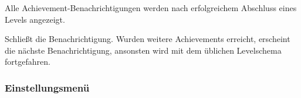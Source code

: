 \begin{center}
\setlength\fboxsep{20pt}
\setlength\fboxrule{1pt}
\end{center}

Alle Achievement-Benachrichtigungen werden nach erfolgreichem Abschluss eines Levels angezeigt.
\begin{requirements}
 Schließt die Benachrichtigung. Wurden weitere Achievements erreicht, erscheint die nächste Benachrichtigung, ansonsten wird mit dem üblichen Levelschema fortgefahren. 
\end{requirements} 

\subsubsection{Einstellungsmenü}

\begin{center}
\setlength\fboxsep{20pt}
\setlength\fboxrule{1pt}
\end{center}

